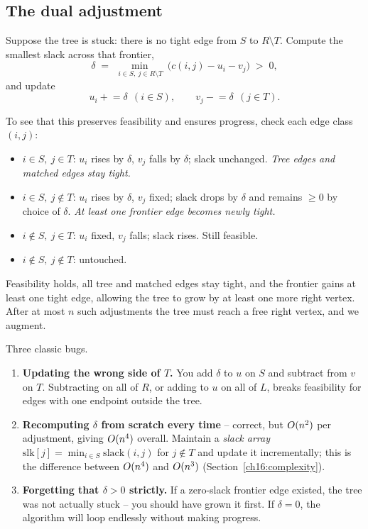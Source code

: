 \subsection{The dual adjustment}

Suppose the tree is stuck: there is no tight edge from $S$ to $R\setminus T$. Compute the smallest slack across that frontier,
\[
  \delta \;=\; \min_{\,i\in S,\ j\in R\setminus T}\ \bigl(c(i,j) - u_i - v_j\bigr) \;>\;0 ,
\]
and update
\[
  u_i \mathrel{+}= \delta \ \ (i\in S),\qquad
  v_j \mathrel{-}= \delta \ \ (j\in T).
\]

\begin{whybox}
To see that this preserves feasibility and ensures progress, check each edge class $(i,j)$:
\begin{itemize}
  \item $i\in S,\ j\in T$: $u_i$ rises by $\delta$, $v_j$ falls by $\delta$; slack unchanged. \emph{Tree edges and matched edges stay tight.}
  \item $i\in S,\ j\notin T$: $u_i$ rises by $\delta$, $v_j$ fixed; slack drops by $\delta$ and remains $\ge0$ by choice of $\delta$. \emph{At least one frontier edge becomes newly tight.}
  \item $i\notin S,\ j\in T$: $u_i$ fixed, $v_j$ falls; slack rises. Still feasible.
  \item $i\notin S,\ j\notin T$: untouched.
\end{itemize}
Feasibility holds, all tree and matched edges stay tight, and the frontier gains at least one tight edge, allowing the tree to grow by at least one more right vertex. After at most $n$ such adjustments the tree must reach a free right vertex, and we augment.
\end{whybox}

\begin{trapbox}
Three classic bugs.
\begin{enumerate}
  \item \textbf{Updating the wrong side of $T$.} You add $\delta$ to $u$ on $S$ and subtract from $v$ on $T$. Subtracting on all of $R$, or adding to $u$ on all of $L$, breaks feasibility for edges with one endpoint outside the tree.
  \item \textbf{Recomputing $\delta$ from scratch every time} -- correct, but $O(n^2)$ per adjustment, giving $O(n^4)$ overall. Maintain a \emph{slack array} $\mathrm{slk}[j]=\min_{i\in S}\mathrm{slack}(i,j)$ for $j\notin T$ and update it incrementally; this is the difference between $O(n^4)$ and $O(n^3)$ (Section~\ref{ch16:complexity}).
  \item \textbf{Forgetting that $\delta>0$ strictly.} If a zero-slack frontier edge existed, the tree was not actually stuck -- you should have grown it first. If $\delta = 0$, the algorithm will loop endlessly without making progress.
\end{enumerate}
\end{trapbox}

